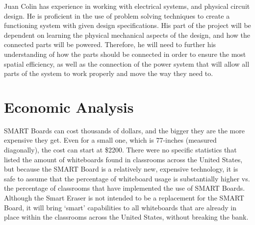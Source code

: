 \documentclass[10pt,onecolumn,draftclsnofoot]{IEEEtran} 					%
\begin{document}
	\setlength{\parindent}{5ex}	
	Juan Colin has experience in working with electrical systems, and physical circuit design. He is proficient in the use of problem solving techniques to create a functioning system with given design specifications. His part of the project will be dependent on learning the physical mechanical aspects of the design, and how the connected parts will be powered. Therefore, he will need to further his understanding of how the parts should be connected in order to ensure the most spatial efficiency, as well as the connection of the power system that will allow all parts of the system to work properly and move the way they need to. 
	\section{Economic Analysis}
	\setlength{\parindent}{5ex}
	SMART Boards can cost thousands of dollars, and the bigger they are the more expensive they get. Even for a small one, which is 77-inches (measured diagonally), the cost can start at \$2200. There were no specific statistics that listed the amount of whiteboards found in classrooms across the United States, but because the SMART Board is a relatively new, expensive technology, it is safe to assume that the percentage of whiteboard usage is substantially higher vs. the percentage of classrooms that have implemented the use of SMART Boards. Although the Smart Eraser is not intended to be a replacement for the SMART Board, it will bring {\lq}smart{\rq} capabilities to all whiteboards that are already in place within the classrooms across the United States, without breaking the bank.\\
\end{document}
